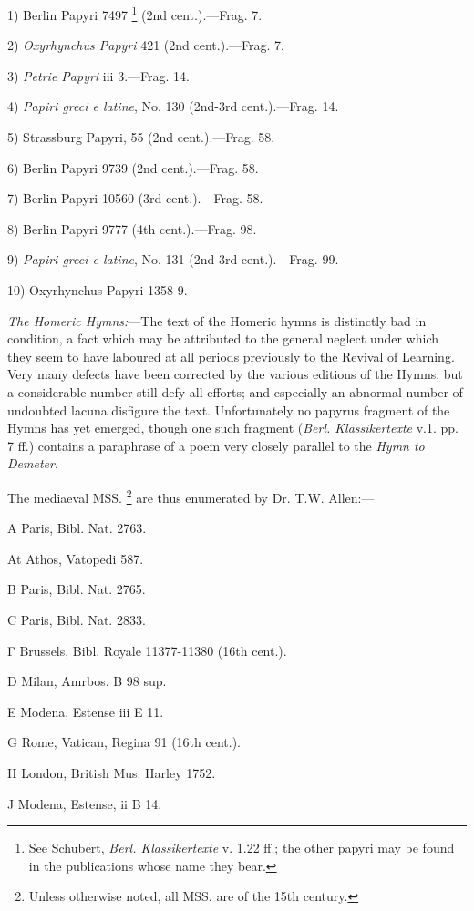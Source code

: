 1) Berlin Papyri 7497 \footnote{See Schubert, \emph{Berl.
Klassikertexte} v. 1.22 ff.; the other papyri may be found in the
publications whose name they bear.} (2nd cent.).—Frag. 7.

2) \emph{Oxyrhynchus Papyri} 421 (2nd cent.).—Frag. 7.

3) \emph{Petrie Papyri} iii 3.—Frag. 14.

4) \emph{Papiri greci e latine}, No. 130 (2nd-3rd cent.).—Frag.
14.

5) Strassburg Papyri, 55 (2nd cent.).—Frag. 58.

6) Berlin Papyri 9739 (2nd cent.).—Frag. 58.

7) Berlin Papyri 10560 (3rd cent.).—Frag. 58.

8) Berlin Papyri 9777 (4th cent.).—Frag. 98.

9) \emph{Papiri greci e latine}, No. 131 (2nd-3rd cent.).—Frag.
99.

10) Oxyrhynchus Papyri 1358-9.

\emph{The Homeric Hymns:}—The text of the Homeric hymns is distinctly bad
in condition, a fact which may be attributed to the general neglect under which
they seem to have laboured at all periods previously to the Revival of
Learning. Very many defects have been corrected by the various editions of the
Hymns, but a considerable number still defy all efforts; and especially an
abnormal number of undoubted lacuna disfigure the text. Unfortunately no
papyrus fragment of the Hymns has yet emerged, though one such fragment
(\emph{Berl. Klassikertexte} v.1. pp. 7 ff.) contains a paraphrase of a poem
very closely parallel to the \emph{Hymn to Demeter}.

The mediaeval MSS. \footnote{Unless otherwise noted,
all MSS. are of the 15th century.} are thus enumerated by Dr. T.W.
Allen:—

A Paris, Bibl. Nat. 2763.

At Athos, Vatopedi 587.

B Paris, Bibl. Nat. 2765.

C Paris, Bibl. Nat. 2833.

Γ Brussels, Bibl. Royale 11377-11380 (16th cent.).

D Milan, Amrbos. B 98 sup.

E Modena, Estense iii E 11.

G Rome, Vatican, Regina 91 (16th cent.).

H London, British Mus. Harley 1752.

J Modena, Estense, ii B 14.

